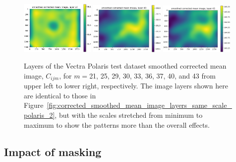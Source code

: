 \documentclass[letterpaper,11pt]{article}
\newcommand{\reffig}[1]{Figure~\ref{#1}}
\begin{document}
\begin{figure}[!ht]
\includegraphics[width=0.32\textwidth]{images/results/smoothed_corrected_mean_image_layers_polaris/smoothed_corrected_mean_image_layer_37}
\includegraphics[width=0.32\textwidth]{images/results/smoothed_corrected_mean_image_layers_polaris/smoothed_corrected_mean_image_layer_40}
\includegraphics[width=0.32\textwidth]{images/results/smoothed_corrected_mean_image_layers_polaris/smoothed_corrected_mean_image_layer_43}
\caption{\footnotesize Layers of the Vectra Polaris test dataset smoothed corrected mean image, $C_{ijm}$, for $m=$21, 25, 29, 30, 33, 36, 37, 40, and 43 from upper left to lower right, respectively. The image layers shown here are identical to those in \reffig{fig:corrected_smoothed_mean_image_layers_same_scale_polaris_2}, but with the scales stretched from minimum to maximum to show the patterns more than the overall effects.}
\label{fig:corrected_smoothed_mean_image_layers_polaris_2}
\end{figure}

\clearpage

\subsection{Impact of masking}
\label{ssec:impact_of_masking}
\end{document}
